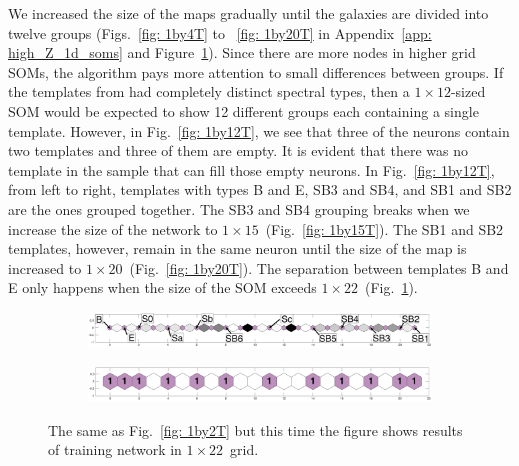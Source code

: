             We increased the size of the maps gradually until the galaxies are divided into twelve groups (Figs.~\ref{fig: 1by4T} to ~\ref{fig: 1by20T} in Appendix~\ref{app: high_Z_1d_soms} and Figure~\ref{fig: 1by22T}).
            Since there are more nodes in higher grid SOMs, the algorithm 
            pays more attention to small differences between groups.
            If the templates from  had completely distinct spectral types, then a $1\times12$-sized SOM would be expected to show 12 different groups each containing a single template.
            However, in Fig.~\ref{fig: 1by12T}, we see that three of the neurons contain two templates and three of them are empty.
            It is evident that there was no template in the  sample that can fill those empty neurons.
            In Fig.~\ref{fig: 1by12T}, from left to right, templates with types B and E, SB3 and SB4, and SB1 and SB2 are the ones grouped together. 
            The SB3 and SB4 grouping breaks when we increase the size of the network to $1\times15$~(Fig.~\ref{fig: 1by15T}).
            The SB1 and SB2 templates, however, remain in the same neuron until the size of the map is increased to $1\times20$~(Fig.~\ref{fig: 1by20T}).
            The separation between templates B and E only happens when the size of the SOM exceeds $1\times22$~(Fig.~\ref{fig: 1by22T}).
            \begin{figure}
                \begin{subfigure}[b]{\textwidth}
                    \centering
                    \includegraphics[width=\textwidth]{images0.01/1d/dist_1_by_22.png}
                \end{subfigure}
                \hfill
                \begin{subfigure}[b]{\textwidth}
                    \includegraphics[width=\textwidth]{images0.01/1d/hit_t_1_by_22.png}
                \end{subfigure}
                \caption[Results of training network in $1\times22$~grid]{The same as Fig.~\ref{fig: 1by2T} but this time the figure shows results of training network in $1\times22$~grid.}
                \label{fig: 1by22T}
            \end{figure} 
    
